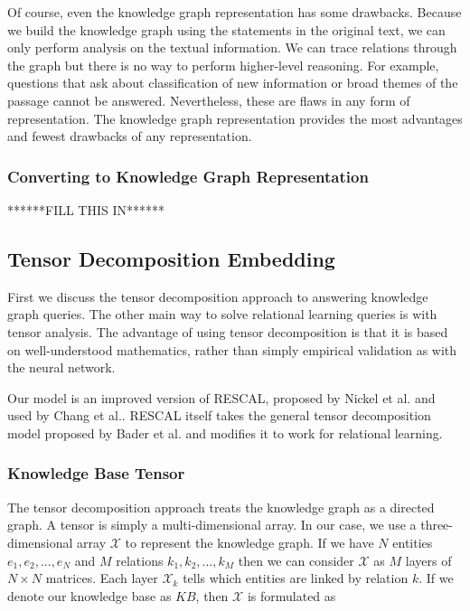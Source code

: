 \documentclass[pageno]{jpaper}
\begin{document}
Of course, even the knowledge graph representation has some drawbacks. Because
we build the knowledge graph using the statements in the original text, we can
only perform analysis on the textual information. We can trace relations through
the graph but there is no way to perform higher-level reasoning. For example,
questions that ask about classification of new information or broad themes of
the passage cannot be answered. Nevertheless, these are flaws in any form of
representation. The knowledge graph representation provides the most advantages
and fewest drawbacks of any representation. \\

\subsubsection{Converting to Knowledge Graph Representation}
\label{Converting to Knowledge Graph Representation}
******FILL THIS IN****** \\

\subsection{Tensor Decomposition Embedding}
\label{Tensor Decomposition Embedding}

First we discuss the tensor decomposition approach to answering knowledge graph
queries. The other main way to solve relational learning queries is with tensor
analysis.  The advantage of using tensor decomposition is that it is based on
well-understood mathematics, rather than simply empirical validation as with the
neural network.

Our model is an improved version of RESCAL, proposed by Nickel et
al.\cite{Nickel2011} and used by Chang et al.\cite{Chang2014}. RESCAL itself
takes the general tensor decomposition model proposed by Bader et
al.\cite{Bader2007} and modifies it to work for relational learning. \\

\subsubsection{Knowledge Base Tensor}
\label{Knowledge Base Tensor}

The tensor decomposition approach treats the knowledge graph as a directed
graph. A tensor is simply a multi-dimensional array. In our case, we use a
three-dimensional array $\mathcal{X}$ to represent the knowledge graph. If we
have $N$ entities $e_1, e_2, ..., e_N$ and $M$ relations $k_1, k_2, ..., k_M$
then we can consider $\mathcal{X}$ as $M$ layers of $N\times N$ matrices. Each layer
$\mathcal{X}_k$ tells which entities are linked by relation $k$. If we denote
our knowledge base as $KB$, then $\mathcal{X}$ is formulated as
\end{document}
